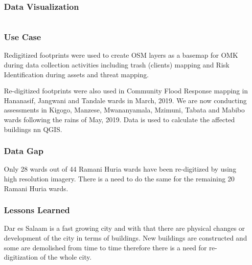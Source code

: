 \documentclass[a4paper,12pt,twoside]{article}
\begin{document}
\subsubsection{Data Visualization}
\begin{tabular}{|c@{}c|}
  \hline
 
  \hline
\end{tabular}


\subsubsection{Use Case}
Redigitized footprints were used to create OSM layers as a basemap for OMK during data collection activities including trash (clients) mapping and Risk Identification during assets and threat mapping. 

Re-digitized footprints were also used in Community Flood Response mapping in Hananasif, Jangwani and Tandale wards in March, 2019. We are now conducting assessments in Kigogo, Manzese, Mwananyamala, Mzimuni, Tabata and Mabibo wards following the rains of May, 2019. Data is used to calculate the affected buildings nn QGIS.


\subsubsection{Data Gap}
Only 28 wards out of 44 Ramani Huria wards have been re-digitized by using high resolution imagery. There is a need to do the same for the remaining 20 Ramani Huria wards.

\subsubsection{Lessons Learned}
Dar es Salaam is a fast growing city and with that there are physical changes or development of the city in terms of buildings. New buildings are constructed and some are demolished from time to time therefore there is a need for re-digitization of the whole city.
\end{document}
